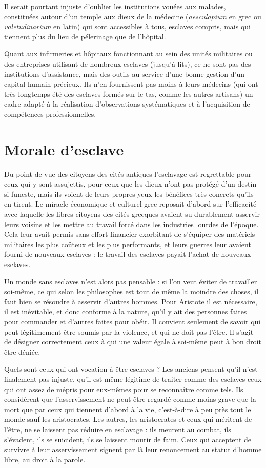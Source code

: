  Il serait pourtant injuste d'oublier les institutions vouées aux malades, constituées autour d'un temple aux dieux de la médecine (\emph{aesculapium} en grec ou \emph{valetudinarium} en latin) qui sont accessibles à tous, esclaves compris, mais qui tiennent plus du lieu de pélerinage que de l'hôpital. 

 Quant aux infirmeries et hôpitaux fonctionnant au sein des unités militaires ou des entreprises utilisant de nombreux esclaves (jusqu'à  lits), ce ne sont pas des institutions d'assistance, mais des outils au service d'une bonne gestion d'un capital humain précieux. Ils n'en fournissent pas moins à leurs médecins (qui ont très longtemps été des esclaves formés sur le tas, comme les autres artisans) un cadre adapté à la réalisation d'observations systématiques et à l'acquisition de compétences professionnelles.


\section{Morale d'esclave}

 Du point de vue des citoyens des cités antiques l'esclavage est regrettable pour ceux qui y sont assujettis, pour ceux que les dieux n'ont pas protégé d'un destin si funeste, mais ils voient de leurs propres yeux les bénéfices très concrets qu'ils en tirent. Le miracle économique et culturel grec reposait d'abord sur l'efficacité avec laquelle les libres citoyens des cités grecques avaient su durablement asservir leurs voisins et les mettre au travail forcé dans les industries lourdes de l'époque. Cela leur avait permis sans effort financier exorbitant de s'équiper des matériels militaires les plus coûteux et les plus performants, et leurs guerres leur avaient fourni de nouveaux esclaves : le travail des esclaves payait l'achat de nouveaux esclaves. 

 Un monde sans esclaves n'est alors pas pensable : si l'on veut éviter de travailler soi-même, ce qui selon les philosophes est tout de même la moindre des choses, il faut bien se résoudre à asservir d'autres hommes. Pour Aristote il est nécessaire, il est inévitable, et donc conforme à la nature, qu'il y ait des personnes faites pour commander et d'autres faites pour obéir. Il convient seulement de savoir qui peut légitimement être soumis par la violence, et qui ne doit pas l'être. Il s'agit de désigner correctement ceux à qui une valeur égale à soi-même peut à bon droit être déniée. 

 Quels sont ceux qui ont vocation à être esclaves ? Les anciens pensent qu'il n'est finalement pas injuste, qu'il est même légitime de traiter comme des esclaves ceux qui ont assez de mépris pour eux-mêmes pour se reconnaître comme tels. Ils considèrent que l'asservissement ne peut être regardé comme moins grave que la mort que par ceux qui tiennent d'abord à la vie, c'est-à-dire à peu près tout le monde sauf les aristocrates. Les autres, les aristocrates et ceux qui méritent de l'être, ne se laissent pas réduire en esclavage : ils meurent au combat, ils s'évadent, ils se suicident, ils se laissent mourir de faim. Ceux qui acceptent de survivre à leur asservissement signent par là leur renoncement au statut d'homme libre, au droit à la parole. 

